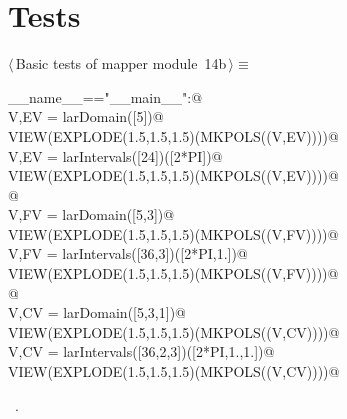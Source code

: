 \documentclass[11pt,oneside]{article}	%
\begin{document}
\section{Tests}

	
\begin{flushleft} \small \label{scrap32}
\protect{}$\langle\,$Basic tests of mapper module\nobreak\ {\footnotesize 14b}$\,\rangle\equiv$
\vspace{-1ex}
\begin{list}{}{} \item
\mbox{}\verb@if __name__=="__main__":@\\
\mbox{}\verb@   V,EV = larDomain([5])@\\
\mbox{}\verb@   VIEW(EXPLODE(1.5,1.5,1.5)(MKPOLS((V,EV))))@\\
\mbox{}\verb@   V,EV = larIntervals([24])([2*PI])@\\
\mbox{}\verb@   VIEW(EXPLODE(1.5,1.5,1.5)(MKPOLS((V,EV))))@\\
\mbox{}\verb@      @\\
\mbox{}\verb@   V,FV = larDomain([5,3])@\\
\mbox{}\verb@   VIEW(EXPLODE(1.5,1.5,1.5)(MKPOLS((V,FV))))@\\
\mbox{}\verb@   V,FV = larIntervals([36,3])([2*PI,1.])@\\
\mbox{}\verb@   VIEW(EXPLODE(1.5,1.5,1.5)(MKPOLS((V,FV))))@\\
\mbox{}\verb@      @\\
\mbox{}\verb@   V,CV = larDomain([5,3,1])@\\
\mbox{}\verb@   VIEW(EXPLODE(1.5,1.5,1.5)(MKPOLS((V,CV))))@\\
\mbox{}\verb@   V,CV = larIntervals([36,2,3])([2*PI,1.,1.])@\\
\mbox{}\verb@   VIEW(EXPLODE(1.5,1.5,1.5)(MKPOLS((V,CV))))@\\
\mbox{}\verb@@{\NWsep}
\end{list}
\vspace{-1ex}
\footnotesize\addtolength{\baselineskip}{-1ex}
\begin{list}{}{\setlength{\itemsep}{-\parsep}\setlength{\itemindent}{-\leftmargin}}
\item \NWtxtMacroRefIn\ .
\end{list}
\end{flushleft}
\end{document}

